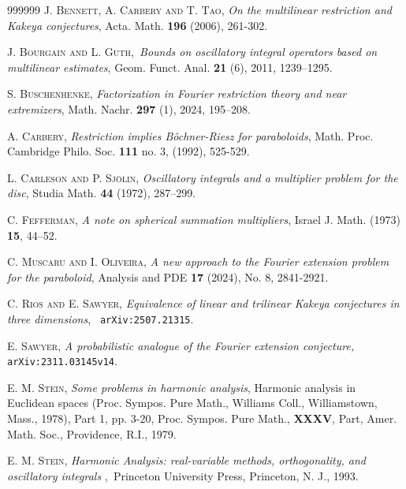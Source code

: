 \documentclass{amsart}%
\theoremstyle{plain}
\numberwithin{equation}{section}
\begin{document}
\begin{thebibliography}{999999}                                                                                           %
\textsc{J. Bennett, A. Carbery and T. Tao}, \textit{On
the multilinear restriction and Kakeya conjectures}, Acta. Math. \textbf{196}
(2006), 261-302.

\textsc{J. Bourgain and L. Guth},\textit{\ Bounds on
oscillatory integral operators based on multilinear estimates}, Geom. Funct.
Anal. \textbf{21} (6), 2011, 1239--1295.

\textsc{S. Buschenhenke,} \textit{Factorization in Fourier
restriction theory and near extremizers}, Math. Nachr. \textbf{297} (1), 2024, 195--208.

\textsc{A. Carbery,} \textit{Restriction implies
B\^{o}chner-Riesz for paraboloids}, Math. Proc. Cambridge Philo. Soc.
\textbf{111 }no. 3, (1992), 525-529.

\textsc{L. Carleson and P. Sj\"{o}lin,}
\textit{Oscillatory integrals and a multiplier problem for the disc}, Studia
Math. \textbf{44} (1972), 287--299.

\textsc{C. Fefferman, }\textit{A note on spherical summation
multipliers}, Israel J. Math. (1973) \textbf{15}, 44--52.

\textsc{C. Muscaru and I. Oliveira,} \textit{A new
approach to the Fourier extension problem for the paraboloid}, Analysis and
PDE \textbf{17} (2024), No. 8, 2841-2921.

\textsc{C. Rios and E. Sawyer,} \textit{Equivalence of
linear and trilinear Kakeya conjectures in three dimensions},\textit{\ }%
\texttt{arXiv:2507.21315}.

\textsc{E. Sawyer,} \textit{A probabilistic analogue of
the Fourier extension conjecture, }\texttt{arXiv:2311.03145v14}.

\textsc{E. M. Stein,} \textit{Some problems in harmonic
analysis}, Harmonic analysis in Euclidean spaces (Proc. Sympos. Pure Math.,
Williams Coll., Williamstown, Mass., 1978), Part 1, pp. 3-20, Proc. Sympos.
Pure Math., \textbf{XXXV}, Part, Amer. Math. Soc., Providence, R.I., 1979.

\textsc{E. M. Stein,} \textit{Harmonic Analysis:
real-variable methods, orthogonality, and oscillatory integrals}%
,\textit{\ }Princeton University Press, Princeton, N. J., 1993.


\end{thebibliography}
\end{document}

